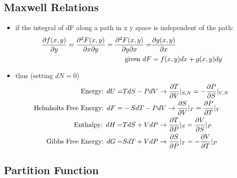 \subsection{Maxwell Relations}
\begin{itemize}
	\item if the integral of dF along a path in x y space is independent of the path:
	      \begin{align*}
		      \pdv{f(x,y)}{y} = \pdv{F(x,y)}{x}{y} = \pdv{F(x,y)}{y}{x} = & \pdv{g(x,y)}{x}       \\
		      \text{given } dF                                            & = f(x,y)dx + g(x,y)dy
	      \end{align*}
	\item thus (setting $dN = 0$)
	      \begin{align*}
		      \text{Energy: } dU =                & T dS - PdV \rightarrow \pdv{T}{V}|_{S,N} = - \pdv{P}{S}|_{V,N} \\
		      \text{Helmholts Free Energy: } dF = & -S dT - P dV \rightarrow \pdv{S}{V}|_T = \pdv{P}{T}|_V         \\
		      \text{Enthalpy: } dH =              & T dS + V dP \rightarrow \pdv{T}{P}|_S = \pdv{V}{S}|_P          \\
		      \text{Gibbs Free Energy: } dG =     & S dT + V dP  \rightarrow \pdv{S}{P}|_T = - \pdv{V}{T}|_P
	      \end{align*}

\end{itemize}

\subsection{Partition Function}
